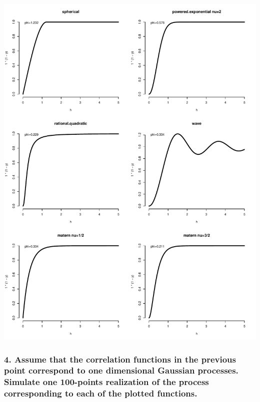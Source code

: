 \documentclass[12pt]{article}
\begin{document}
\begin{center}
\includegraphics[scale=0.67]{figs/semi-variogram.pdf}
\end{center}

\subsubsection*{4. Assume that the correlation functions in the previous point correspond to one dimensional Gaussian processes. Simulate one 100-points realization of the process corresponding to each of the plotted functions.}
\end{document}
